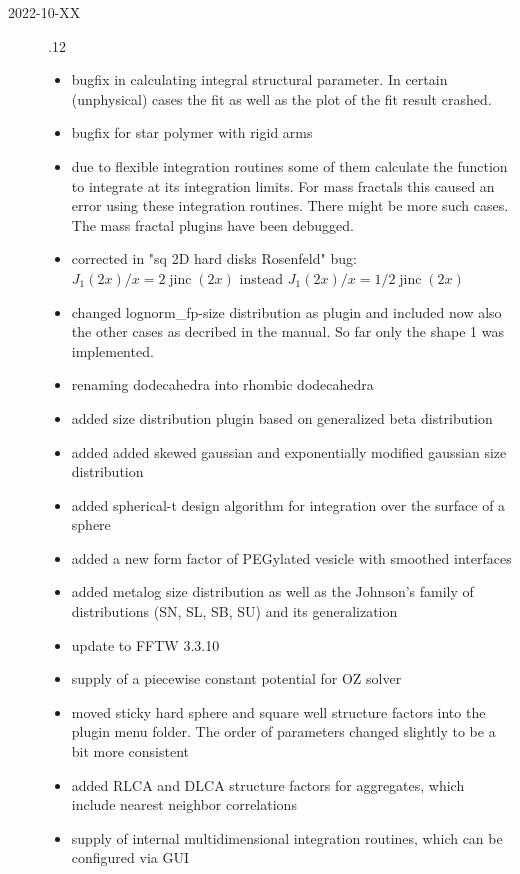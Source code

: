 \begin{description}
\item[2022-10-XX] .12
    \begin{itemize}
    \item bugfix in calculating integral structural parameter. 
          In certain (unphysical) cases the fit as well as the plot of the fit result crashed.
    \item bugfix for star polymer with rigid arms
    \item  due to flexible integration routines some of them calculate the function to integrate at its integration limits. For mass fractals this caused an error using these integration routines. There might be more such cases. The mass fractal plugins have been debugged.
    \item  corrected in "sq 2D hard disks Rosenfeld" bug: $J_1(2x)/x = 2\operatorname{jinc}(2x)$ instead $J_1(2x)/x = 1/2 \operatorname{jinc}(2x)$
    \item changed lognorm\_fp-size distribution as plugin and included now also the other cases as decribed in the manual. So far only the shape 1 was implemented.
    \item renaming dodecahedra into rhombic dodecahedra
    \item added size distribution plugin based on generalized beta distribution
    \item added added skewed gaussian and exponentially modified gaussian size distribution
    \item added spherical-t design algorithm for integration over the surface of a sphere
    \item added a new form factor of PEGylated vesicle with smoothed interfaces
    \item added metalog size distribution as well as the Johnson's family of distributions (SN, SL, SB, SU) and its generalization
    \item update to FFTW 3.3.10
    \item supply of a piecewise constant potential for OZ solver
    \item moved sticky hard sphere and square well structure factors into the plugin menu folder.
            The order of parameters changed slightly to be a bit more consistent
    \item added RLCA and DLCA structure factors for aggregates, which include nearest neighbor correlations
    \item supply of internal multidimensional integration routines, which can be configured via GUI

\end{itemize}
\end{description}
